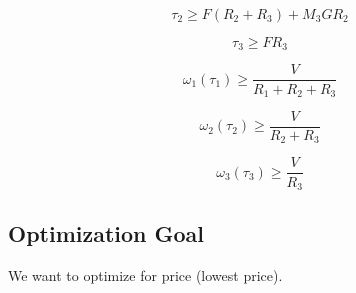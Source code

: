 \documentclass{article}
\begin{document}
\begin{equation}
    \tau_2 \geq F(R_2 + R_3) + M_3 G R_2
\end{equation}

\begin{equation}
    \tau_3 \geq F R_3
\end{equation}

\begin{equation}
    \omega_1(\tau_1) \geq \frac{V}{R_1 + R_2 + R_3}
\end{equation}

\begin{equation}
    \omega_2(\tau_2) \geq \frac{V}{R_2 + R_3}
\end{equation}

\begin{equation}
    \omega_3(\tau_3) \geq \frac{V}{R_3}
\end{equation}

\FloatBarrier
\subsection{Optimization Goal}

We want to optimize for price (lowest price).
\end{document}
